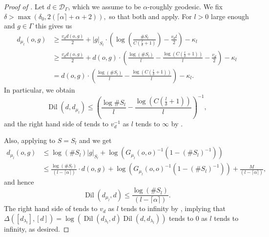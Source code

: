 \documentclass[twoside]{amsart}
\theoremstyle{definition}
\numberwithin{equation}{section}
\numberwithin{theorem}{section}
\newcommand{\calD}{\mathcal{D}}
\newcommand{\al}{\alpha}
\newcommand{\G}{\Gamma}
\newcommand{\Del}{\Delta}
\newcommand{\del}{\delta}
\renewcommand{\k}{\kappa}
\newcommand{\lam}{\lambda}
\newcommand{\m}{\mu}
\DeclareMathOperator{\Dil}{Dil}
\begin{document}
\begin{proof}[Proof of ]
    Let $d\in \calD_\G$, which we assume to be $\al$-roughly geodesic. We fix $\del>\max(\del_0,2(\lceil \al\rceil+\al+2)),$ so that both  and   apply. For $l>0$ large enough and $g\in \G$ this gives us 
    \begin{align*}
                d_{\m_l}(o,g) &\geq \frac{v_dd(o,g)}{2}+|g|_{S_l}\cdot \left(\log\left(\frac{\#S_l}{C\left(\frac{l}{\del}+1\right)}\right)-\frac{v_d l}{2}\right)-\k_l\\
                & \geq  \frac{v_dd(o,g)}{2}+d(o,g)\cdot \left(\frac{\log(\# S_l)}{l}-\frac{\log(C\left(\frac{l}{\del}+1\right))}{l}-\frac{v_d}{2}\right)-\k_l\\
                & = d(o,g)\cdot \left(\frac{\log(\# S_l)}{l}-\frac{\log(C\left(\frac{l}{\del}+1\right))}{l}\right)-\k_l.
    \end{align*}    
In particular, we obtain
    \begin{equation}\label{eq.ineqDil1}
        \Dil(d,d_{\m_l})\leq \left(\frac{\log{\# S_l}}{l}-\frac{\log(C(\frac{l}{\del}+1))}{l}\right)^{-1},
    \end{equation}
 and the right hand side of  tends to $v_d^{-1}$ as $l$ tends to  $\infty$ by .

 Also, applying  to $S=S_l$ and  we get
\begin{align*}
    d_{\m_l}(o,g)& \leq \log(\# S_l)|g|_{S_l}+\log(G_{\m_l}(o,o)^{-1}(1-(\#S_l)^{-1})) \\
    & \leq \frac{\log(\# S_l)}{(l-\lceil \al\rceil)}\cdot d(o,g)+\log(G_{\m_l}(o,o)^{-1}(1-(\#S_l)^{-1}))+\frac{M}{(l-\lceil \al \rceil)}, 
\end{align*}
and hence
\begin{equation}\label{eq.greenDil2}
    \Dil(d_{\m_l},d)\leq  \frac{\log(\# S_l)}{(l-\lceil \al\rceil)}.
\end{equation}
 The right hand side of  tends to $v_d$ as $l$ tends to infinity by , implying that  $\Del([d_{\lam_l}],[d])=\log(\Dil(d_{\lam_l},d)\Dil(d,d_{\lam_l}))$ tends to $0$ as $l$ tends to infinity, as desired.
\end{proof}

\medskip




\end{document}
